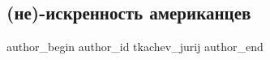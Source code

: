  
 
 
 
 
\subsection{(не)-искренность американцев}
\label{sec:22_01_2022.tg.tkachev_jurij.1.amerikancy}
 
\ifcmt
 author_begin
   author_id tkachev_jurij
 author_end
\fi

